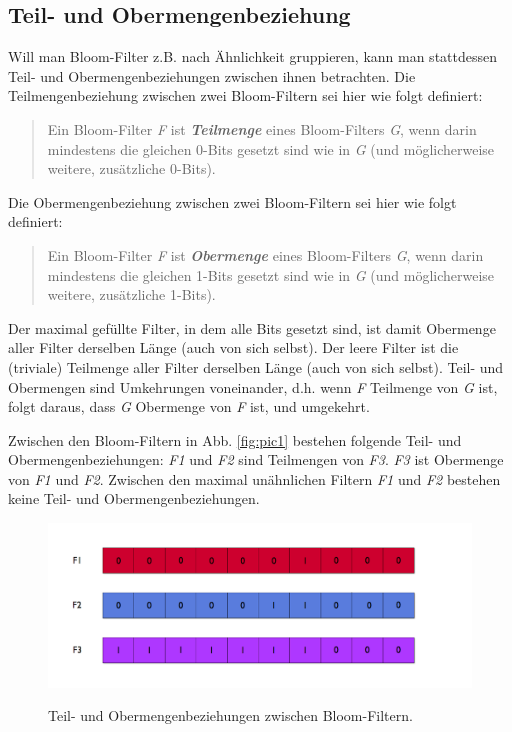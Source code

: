 \subsection{Teil- und Obermengenbeziehung}\label{sec:mengenbeziehungen}
Will man Bloom-Filter z.B. nach Ähnlichkeit gruppieren, kann man stattdessen Teil- und Obermengenbeziehungen zwischen ihnen betrachten. Die Teilmengenbeziehung zwischen zwei Bloom-Filtern sei hier wie folgt definiert: 
\begin{quote}
Ein Bloom-Filter \textit{F} ist \textbf{\textit{Teilmenge}} eines Bloom-Filters \textit{G}, wenn darin mindestens die gleichen 0-Bits gesetzt sind wie in \textit{G} (und möglicherweise weitere, zusätzliche 0-Bits).
\end{quote}
Die Obermengenbeziehung zwischen zwei Bloom-Filtern sei hier wie folgt definiert: 
\begin{quote}
Ein Bloom-Filter \textit{F} ist \textbf{\textit{Obermenge}} eines Bloom-Filters \textit{G}, wenn darin mindestens die gleichen 1-Bits gesetzt sind wie in \textit{G} (und möglicherweise weitere, zusätzliche 1-Bits).
\end{quote}
Der maximal gefüllte Filter, in dem alle Bits gesetzt sind, ist damit Obermenge aller Filter derselben Länge (auch von sich selbst). Der leere Filter ist die (triviale) Teilmenge aller Filter derselben Länge (auch von sich selbst). Teil- und Obermengen sind Umkehrungen voneinander, d.h. wenn \textit{F} Teilmenge von \textit{G} ist, folgt daraus, dass \textit{G} Obermenge von \textit{F} ist, und umgekehrt.  

Zwischen den Bloom-Filtern in Abb. \ref{fig:pic1} bestehen folgende Teil- und Obermengenbeziehungen: \textit{F1} und \textit{F2} sind Teilmengen von \textit{F3}. \textit{F3} ist Obermenge von \textit{F1} und \textit{F2}. Zwischen den maximal unähnlichen Filtern \textit{F1} und \textit{F2} bestehen keine Teil- und Obermengenbeziehungen. 
\begin{figure}[hpbt]
  \centering
  \includegraphics[width=1.0\textwidth]{pictures/distances.png}\\
  \caption[Teil- und Obermengenbeziehungen zwischen Bloom-Filtern]{Teil- und Obermengenbeziehungen zwischen Bloom-Filtern.}\label{fig:pic2}
\end{figure}

